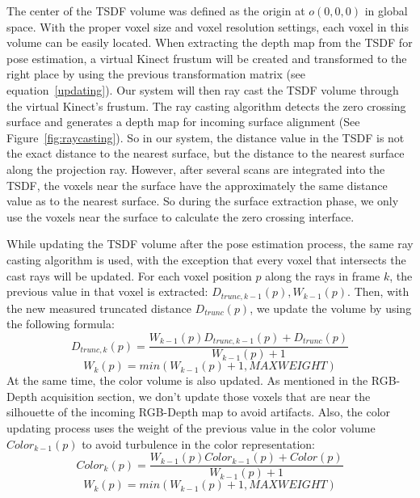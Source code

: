 \documentclass[12pt]{article}
\begin{document}
The center of the TSDF volume was defined as the origin at $o(0,0,0)$ in global space. With the proper voxel size and voxel resolution settings, each voxel in this volume can be easily located. When extracting the depth map from the TSDF for pose estimation, a virtual Kinect frustum will be created and transformed to the right place by using the previous transformation matrix (see equation~\ref{updating}). Our system will then ray cast the TSDF volume through the virtual Kinect's frustum. The ray casting algorithm detects the zero crossing surface and generates a depth map for incoming surface alignment (See Figure~\ref{fig:raycasting}). So in our system, the distance value in the TSDF is not the exact distance to the nearest surface, but the distance to the nearest surface along the projection ray. However, after several scans are integrated into the TSDF, the voxels near the surface have the approximately the same distance value as to the nearest surface. So during the surface extraction phase, we only use the voxels near the surface to calculate the zero crossing interface.

While updating the TSDF volume after the pose estimation process, the same ray casting algorithm is used, with the exception that every voxel that intersects the cast rays will be updated. For each voxel position $p$ along the rays in frame $k$, the previous value in that voxel is extracted: $D_{trunc,k-1}(p),W_{k-1}(p)$. Then, with the new measured truncated distance $D_{trunc}(p)$, we update the volume by using the following formula:
$$D_{trunc,k}(p) = \frac{W_{k-1}(p)D_{trunc,k-1}(p)+D_{trunc}(p)}{W_{k-1}(p)+1}$$    
$$W_k(p) = min(W_{k-1}(p)+1,MAXWEIGHT)$$
At the same time, the color volume is also updated. As mentioned in the RGB-Depth acquisition section, we don't update those voxels that are near the silhouette of the incoming RGB-Depth map to avoid artifacts. Also, the color updating process uses the weight of the previous value in the color volume $Color_{k-1}(p)$ to avoid turbulence in the color representation:
$$Color_k(p) = \frac{W_{k-1}(p)Color_{k-1}(p)+Color(p)}{W_{k-1}(p)+1}$$    
$$W_k(p) = min(W_{k-1}(p)+1,MAXWEIGHT)$$
\end{document}
